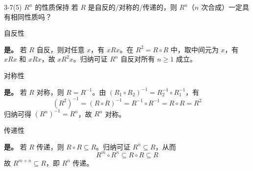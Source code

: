 \documentclass[11pt]{article}
\begin{document}
\begin{question}{3-7(5) $R^n$ 的性质保持}
  若 $R$ 是自反的/对称的/传递的，则 $R^n$（$n$ 次合成）一定具有相同性质吗？

  \begin{subquestion}{自反性}
    \begin{subanswer}
      \textbf{是。} 若 $R$ 自反，则对任意 $x$，有 $xRx$。在 $R^2 = R \circ R$ 中，取中间元为 $x$，有 $xRx$ 和 $xRx$，故 $xR^2x$。归纳可证 $R^n$ 自反对所有 $n \geqslant 1$ 成立。
    \end{subanswer}
  \end{subquestion}

  \begin{subquestion}{对称性}
    \begin{subanswer}
      \textbf{是。} 若 $R$ 对称，则 $R = R^{-1}$。由 $(R_1 \circ R_2)^{-1} = R_2^{-1} \circ R_1^{-1}$，有
      $$(R^2)^{-1} = (R \circ R)^{-1} = R^{-1} \circ R^{-1} = R \circ R = R^2$$
      归纳可得 $(R^n)^{-1} = R^n$，故 $R^n$ 对称。
    \end{subanswer}
  \end{subquestion}

  \begin{subquestion}{传递性}
    \begin{subanswer}
      \textbf{是。} 若 $R$ 传递，则 $R \circ R \subseteq R$。归纳可证 $R^n \subseteq R$，从而
      $$R^m \circ R^n \subseteq R \circ R \subseteq R$$
      故 $R^{m+n} \subseteq R$，即 $R^n$ 传递。
    \end{subanswer}
  \end{subquestion}
\end{question}
\end{document}
